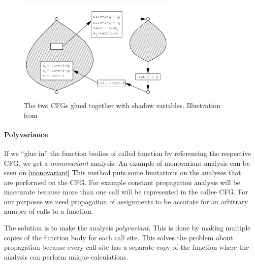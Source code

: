 \begin{figure}[H]
  \center
  \includegraphics[width=0.7\textwidth]{figures/interprocedural_glue}
  \caption{The two CFGs glued together with shadow variables. Illustration from \citet[p.~38]{schwartzbach}}
  \label{interprocedural_glue}
\end{figure}

\paragraph{Polyvariance}
If we ``glue in'' the function bodies of called function by referencing the respective CFG, we get a \emph{monovariant} analysis.
An example of monovariant analysis can be seen on \cref{monovariant}
This method puts some limitations on the analyses that are performed on the CFG.
For example constant propagation analysis will be inaccurate because more than one call will be represented in the callee CFG.
For our purposes we need propagation of assignments to be accurate for an arbitrary number of calls to a function.

The solution is to make the analysis \emph{polyvariant}.
This is done by making multiple copies of the function body for each call site.
This solves the problem about propagation because every call site has a separate copy of the function where the analysis can perform unique calculations.

